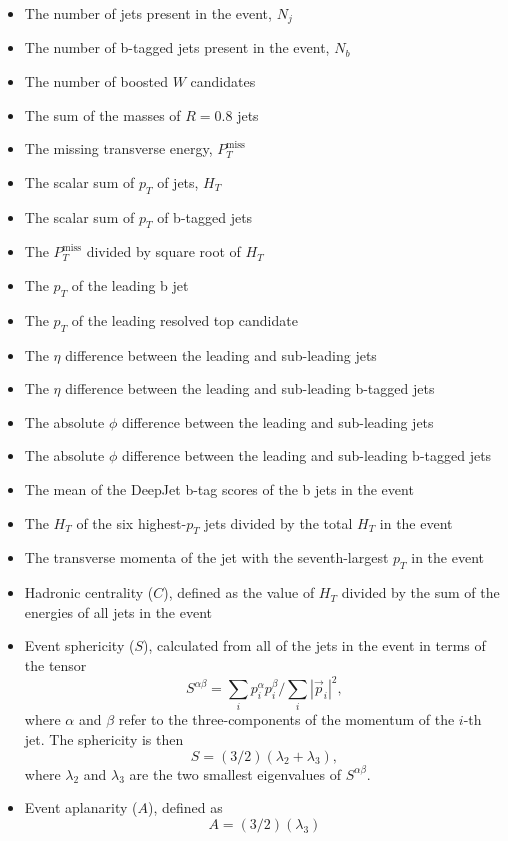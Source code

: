 \documentclass[twoside]{article}
\begin{document}
\begin{itemize}
    \item The number of jets present in the event, $N_j$
    \item The number of b-tagged jets present in the event, $N_b$
    \item The number of boosted $W$ candidates
    \item The sum of the masses of $R = 0.8$ jets
    \item The missing transverse energy, $P_T^{\text{miss}}$
    \item The scalar sum of $p_T$ of jets, $H_T$
    \item The scalar sum of $p_T$ of b-tagged jets
    \item The $P_T^{\text{miss}}$ divided by square root of $H_T$
    \item The $p_T$ of the leading b jet
    \item The $p_T$ of the leading resolved top candidate
    \item The $\eta$ difference between the leading and sub-leading jets
    \item The $\eta$ difference between the leading and sub-leading b-tagged jets
    \item The absolute $\phi$ difference between the leading and sub-leading jets
    \item The absolute $\phi$ difference between the leading and sub-leading b-tagged jets
    \item The mean of the DeepJet b-tag scores of the b jets in the event
    \item The $H_T$ of the six highest-$p_T$ jets divided by the total $H_T$ in the event
    \item The transverse momenta of the jet with the seventh-largest $p_T$ in the event
    \item Hadronic centrality ($C$), defined as the value of $H_T$ divided by the sum of the energies of all jets in the event
    \item Event sphericity ($S$), calculated from all of the jets in the event in terms of the tensor 
    \[
    S^{\alpha\beta} = \sum_i p_i^\alpha p_i^\beta / \sum_i |\vec{p}_i|^2,
    \]
    where $\alpha$ and $\beta$ refer to the three-components of the momentum of the $i$-th jet. The sphericity is then 
    \[
    S = (3/2)(\lambda_2 + \lambda_3),
    \]
    where $\lambda_2$ and $\lambda_3$ are the two smallest eigenvalues of $S^{\alpha\beta}$.
    \item Event aplanarity ($A$), defined as 
    \[
    A = (3/2)(\lambda_3)
    \]
\end{itemize}
\end{document}
